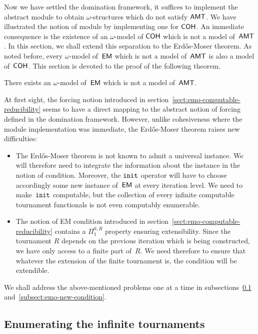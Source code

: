 
Now we have settled the domination framework, it suffices to implement
the abstract module to obtain $\omega$-structures which do not satisfy $\operatorname{\sf{AMT}}$.
We have illustrated the notion of module by implementing one for $\operatorname{\sf{COH}}$.
An immediate consequence is the existence of an $\omega$-model of $\operatorname{\sf{COH}}$
which is not a model of~$\operatorname{\sf{AMT}}$. 
In this section, we shall extend this separation to the Erd\H{o}s-Moser theorem.
As noted before, every $\omega$-model of~$\operatorname{\sf{EM}}$ which is not a model of~$\operatorname{\sf{AMT}}$
is also a model of~$\operatorname{\sf{COH}}$.
This section is devoted to the proof of the following theorem.

\begin{theorem}\label{thm:emo-not-amt}
There exists an $\omega$-model of~$\operatorname{\sf{EM}}$ which is not a model of~$\operatorname{\sf{AMT}}$.
\end{theorem}

At first sight, the forcing notion introduced in section~\ref{sect:emo-computable-reducibility} seems
to have a direct mapping to the abstract notion of forcing defined in the domination framework.
However, unlike cohesiveness where the module implementation was immediate,
the Erd\H{o}s-Moser theorem raises new difficulties:
\begin{itemize}
	\item The Erd\H{o}s-Moser theorem is not known to admit a universal instance.
	We will therefore need to integrate the information about the instance in the notion of condition.
	Moreover, the $\mathtt{init}$ operator will have to choose accordingly some new instance of~$\operatorname{\sf{EM}}$
	at every iteration level. We need to make~$\mathtt{init}$ computable, but the collection of every infinite computable tournament functionals
	is not even computably enumerable.

	\item The notion of EM condition introduced in section~\ref{sect:emo-computable-reducibility} contains a $\Pi^{0,R}_1$ property
	ensuring extensibility. Since the tournament $R$ depends on the previous iteration which is being constructed,
	we have only access to a finite part of~$R$. We need therefore to ensure that whatever the extension of the finite
	tournament is, the condition will be extendible.
\end{itemize}

We shall address the above-mentioned problems one at a time
in subsections~\ref{subsect:enum-emo-infinite} and~\ref{subsect:emo-new-condition}.

\subsection{Enumerating the infinite tournaments}\label{subsect:enum-emo-infinite}

